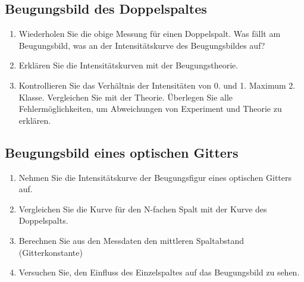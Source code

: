 \subsection{Beugungsbild des Doppelspaltes}
\begin{enumerate}[label=\alph*)]
	\item Wiederholen Sie die obige Messung für einen Doppelspalt. Was fällt am Beugungsbild, was an der Intensitätskurve des Beugungsbildes auf?
	\item Erklären Sie die Intensitätskurven mit der Beugungstheorie.
	\item Kontrollieren Sie das Verhältnis der Intensitäten von 0. und 1. Maximum 2. Klasse. Vergleichen Sie mit der Theorie. Überlegen Sie alle Fehlermöglichkeiten, um Abweichungen von Experiment und Theorie zu erklären.
\end{enumerate}
\subsection{Beugungsbild eines optischen Gitters}
\begin{enumerate}[label=\alph*)]
	\item Nehmen Sie die Intensitätskurve der Beugungsfigur eines optischen Gitters auf.
	\item Vergleichen Sie die Kurve für den N-fachen Spalt mit der Kurve des Doppelspalts.
	\item Berechnen Sie aus den Messdaten den mittleren Spaltabstand (Gitterkonstante)
	\item Versuchen Sie, den Einfluss des Einzelspaltes auf das Beugungsbild zu sehen.
\end{enumerate}